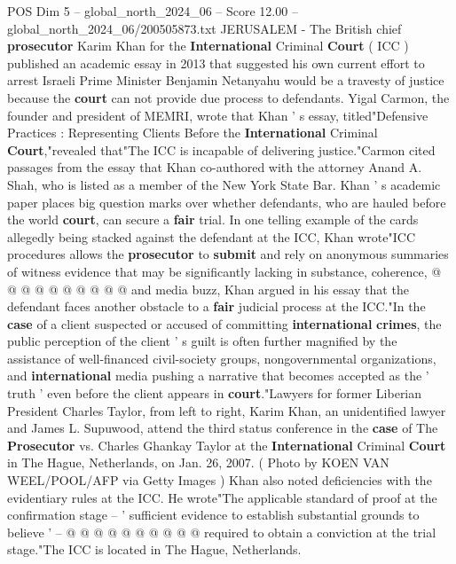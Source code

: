 \begin{textsample}{POS Dim 5 – global\_north\_2024\_06 – Score 12.00 – global\_north\_2024\_06/200505873.txt}  \label{ex:f5_pos_380}
JERUSALEM - The British chief \textbf{prosecutor} Karim Khan for the \textbf{International} Criminal \textbf{Court} ( ICC ) published an academic essay in 2013 that suggested his own current effort to arrest Israeli Prime Minister Benjamin Netanyahu would be a travesty of justice because the \textbf{court} can not provide due process to defendants.
Yigal Carmon, the founder and president of MEMRI, wrote that Khan ' s essay, titled"Defensive Practices : Representing Clients Before the \textbf{International} Criminal \textbf{Court},"revealed that"The ICC is incapable of delivering justice."Carmon cited passages from the essay that Khan co-authored with the attorney Anand A.
Shah, who is listed as a member of the New York State Bar.
Khan ' s academic paper places big question marks over whether defendants, who are hauled before the world \textbf{court}, can secure a \textbf{fair} trial.
In one telling example of the cards allegedly being stacked against the defendant at the ICC, Khan wrote"ICC procedures allows the \textbf{prosecutor} to \textbf{submit} and rely on anonymous summaries of witness evidence that may be significantly lacking in substance, coherence, @ @ @ @ @ @ @ @ @ @ and media buzz, Khan argued in his essay that the defendant faces another obstacle to a \textbf{fair} judicial process at the ICC."In the \textbf{case} of a client suspected or accused of committing \textbf{international} \textbf{crimes}, the public perception of the client ' s guilt is often further magnified by the assistance of well-financed civil-society groups, nongovernmental organizations, and \textbf{international} media pushing a narrative that becomes accepted as the ' truth ' even before the client appears in \textbf{court}."Lawyers for former Liberian President Charles Taylor, from left to right, Karim Khan, an unidentified lawyer and James L.
Supuwood, attend the third status conference in the \textbf{case} of The \textbf{Prosecutor} vs.
Charles Ghankay Taylor at the \textbf{International} Criminal \textbf{Court} in The Hague, Netherlands, on Jan. 26, 2007. ( Photo by KOEN VAN WEEL/POOL/AFP via Getty Images ) Khan also noted deficiencies with the evidentiary rules at the ICC.
He wrote"The applicable standard of proof at the confirmation stage -- ' sufficient evidence to establish substantial grounds to believe ' -- @ @ @ @ @ @ @ @ @ @ required to obtain a conviction at the trial stage."The ICC is located in The Hague, Netherlands.

\end{textsample}
